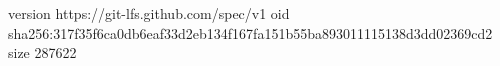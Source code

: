 version https://git-lfs.github.com/spec/v1
oid sha256:317f35f6ca0db6eaf33d2eb134f167fa151b55ba893011115138d3dd02369cd2
size 287622
